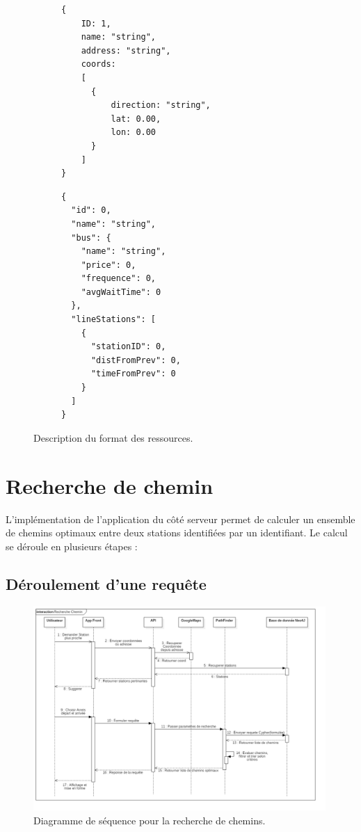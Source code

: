 \begin{figure}[h!]
	\begin{subfigure}[b]{0.45\linewidth}
		\begin{lstlisting}[caption=Format JSON de Station]
{
	ID: 1,
	name: "string",
	address: "string",
	coords: 
	[
	  {
	  	  direction: "string",
  		  lat: 0.00,
   		  lon: 0.00
	  }
	]
}
		\end{lstlisting}
	\end{subfigure}\hfill%
	\begin{subfigure}[b]{0.45\linewidth}
		\begin{lstlisting}[caption=Format JSON de Line]
{
  "id": 0,
  "name": "string",
  "bus": {
    "name": "string",
    "price": 0,
    "frequence": 0,
    "avgWaitTime": 0
  },
  "lineStations": [
    {
      "stationID": 0,
      "distFromPrev": 0,
      "timeFromPrev": 0
    }
  ]
}
		\end{lstlisting}
	\end{subfigure}\hfill%
	\caption{Description du format des ressources.}
	\label{fig:formatResources}
\end{figure}
\newpage
\section{Recherche de chemin}
L'implémentation de l'application du côté serveur permet de calculer un ensemble de chemins optimaux entre deux stations identifiées par un identifiant. Le calcul se déroule en plusieurs étapes :
\subsection{Déroulement d'une requête}

\begin{figure}[h!]
	\center
	\includegraphics[width=0.99\textwidth]{img/RechercheChemin.png}
	\caption{Diagramme de séquence pour la recherche de chemins.}
	\label{fig:diagSequence}
\end{figure}

